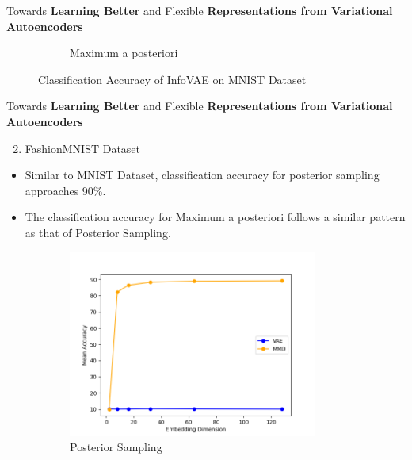 \documentclass[hyperref={colorlinks,citecolor=blue,linkcolor=blue,urlcolor=blue}]{beamer}
\begin{document}
\begin{frame}{ Towards \textbf{Learning Better} and Flexible \textbf{Representations from Variational Autoencoders} \vspace{0.3em}}
\begin{figure}
\begin{subfigure}[b]{0.4\textwidth}
        \caption{Maximum a posteriori}
    \end{subfigure}
    \caption{Classification Accuracy of InfoVAE on MNIST Dataset}
  \end{figure}
\end{frame}

\begin{frame}{ Towards \textbf{Learning Better} and Flexible \textbf{Representations from Variational Autoencoders} \vspace{0.3em}}
  \begin{enumerate}
    \setcounter{enumi}{1}
    \item FashionMNIST Dataset
  \end{enumerate}
  \begin{itemize}
    \item Similar to MNIST Dataset, classification accuracy for posterior sampling approaches 90\%.
    \item The classification accuracy for Maximum a posteriori follows a similar pattern as that of Posterior Sampling.
  \end{itemize}
  \begin{figure}
    \begin{subfigure}[b]{0.4\textwidth}
        \centering
        \includegraphics[width=0.9\textwidth,]{./Images/FashionMNIST_MMD_sampling.png}
        \caption{Posterior Sampling}
    \end{subfigure}
    \begin{subfigure}[b]{0.4\textwidth}
        \centering

\end{subfigure}
\end{figure}
\end{frame}
\end{document}
